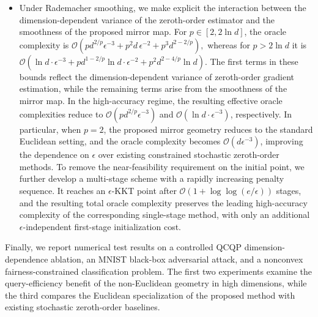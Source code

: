 \documentclass[11pt]{article}
\numberwithin{equation}{section}
\begin{document}
\begin{itemize}
\item
Under Rademacher smoothing, we  make explicit the interaction between the dimension-dependent variance of the zeroth-order estimator and the smoothness of the proposed mirror map. For $p\in[2,2\ln d]$, the oracle complexity is
\(
\mathcal{O}(
p d^{2/p}\epsilon^{-3}
+p^2d\,\epsilon^{-2}
+p^3d^{2-2/p}
),
\) 
whereas for $p>2\ln d$ it is
\(
\mathcal{O}(
\ln d\cdot\epsilon^{-3}
+p d^{1-2/p}\ln d\cdot\epsilon^{-2}
+p^2d^{2-4/p}\ln d).
\) 
The first terms in these bounds reflect the dimension-dependent variance of zeroth-order gradient estimation, while the remaining terms arise from the smoothness of the mirror map. In the high-accuracy regime, the resulting effective oracle complexities reduce to
$\mathcal{O}(p d^{2/p}\epsilon^{-3})$ and
$\mathcal{O}(\ln d\cdot\epsilon^{-3})$, respectively.
In particular, when $p=2$, the proposed mirror geometry reduces to the standard Euclidean setting, and the oracle complexity becomes
$\mathcal{O}(d\epsilon^{-3})$, improving the dependence on $\epsilon$ over existing constrained stochastic zeroth-order methods. 
To remove the near-feasibility requirement on the initial point,
we further develop a multi-stage scheme with a rapidly increasing penalty sequence.
It reaches an $\epsilon$-KKT point after
\(\mathcal{O}(1+\log\log(e/\epsilon))\) stages,
and the resulting total oracle complexity preserves the leading high-accuracy complexity of the corresponding single-stage method, with only an additional $\epsilon$-independent first-stage initialization cost.

\end{itemize}

Finally, we report numerical test results on a controlled QCQP dimension-dependence ablation, an MNIST black-box adversarial attack, and a nonconvex fairness-constrained classification problem.
The first two experiments examine the query-efficiency benefit of the non-Euclidean geometry in high dimensions, while the third compares the Euclidean specialization of the proposed method with existing stochastic zeroth-order baselines.
\end{document}
